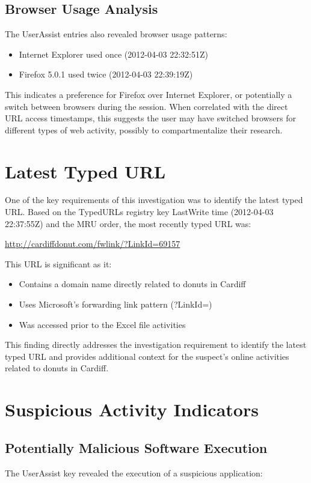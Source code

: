 \subsection{Browser Usage Analysis}
The UserAssist entries also revealed browser usage patterns:

\begin{itemize}
    \item Internet Explorer used once (2012-04-03 22:32:51Z)
    \item Firefox 5.0.1 used twice (2012-04-03 22:39:19Z)
\end{itemize}

This indicates a preference for Firefox over Internet Explorer, or potentially a switch between browsers during the session. When correlated with the direct URL access timestamps, this suggests the user may have switched browsers for different types of web activity, possibly to compartmentalize their research.

\section{Latest Typed URL}
One of the key requirements of this investigation was to identify the latest typed URL. Based on the TypedURLs registry key LastWrite time (2012-04-03 22:37:55Z) and the MRU order, the most recently typed URL was:


\url{http://cardiffdonut.com/fwlink/?LinkId=69157}


This URL is significant as it:
\begin{itemize}
    \item Contains a domain name directly related to donuts in Cardiff
    \item Uses Microsoft's forwarding link pattern (?LinkId=)
    \item Was accessed prior to the Excel file activities
\end{itemize}

This finding directly addresses the investigation requirement to identify the latest typed URL and provides additional context for the suspect's online activities related to donuts in Cardiff.

\section{Suspicious Activity Indicators}
\subsection{Potentially Malicious Software Execution}
The UserAssist key revealed the execution of a suspicious application:

